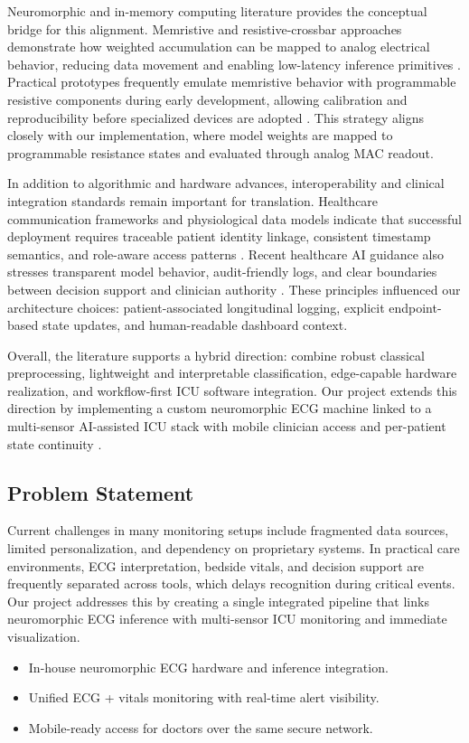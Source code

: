 \documentclass[12pt,a4paper]{article}
\begin{document}
Neuromorphic and in-memory computing literature provides the conceptual bridge for this alignment. Memristive and resistive-crossbar approaches demonstrate how weighted accumulation can be mapped to analog electrical behavior, reducing data movement and enabling low-latency inference primitives \cite{r16,r17,r18}. Practical prototypes frequently emulate memristive behavior with programmable resistive components during early development, allowing calibration and reproducibility before specialized devices are adopted \cite{r19}. This strategy aligns closely with our implementation, where model weights are mapped to programmable resistance states and evaluated through analog MAC readout.

In addition to algorithmic and hardware advances, interoperability and clinical integration standards remain important for translation. Healthcare communication frameworks and physiological data models indicate that successful deployment requires traceable patient identity linkage, consistent timestamp semantics, and role-aware access patterns \cite{r20,r21}. Recent healthcare AI guidance also stresses transparent model behavior, audit-friendly logs, and clear boundaries between decision support and clinician authority \cite{r22,r23}. These principles influenced our architecture choices: patient-associated longitudinal logging, explicit endpoint-based state updates, and human-readable dashboard context.

Overall, the literature supports a hybrid direction: combine robust classical preprocessing, lightweight and interpretable classification, edge-capable hardware realization, and workflow-first ICU software integration. Our project extends this direction by implementing a custom neuromorphic ECG machine linked to a multi-sensor AI-assisted ICU stack with mobile clinician access and per-patient state continuity \cite{r24,r25}.

\subsection{Problem Statement}

Current challenges in many monitoring setups include fragmented data sources, limited personalization, and dependency on proprietary systems. In practical care environments, ECG interpretation, bedside vitals, and decision support are frequently separated across tools, which delays recognition during critical events. Our project addresses this by creating a single integrated pipeline that links neuromorphic ECG inference with multi-sensor ICU monitoring and immediate visualization.
\begin{itemize}
  \item In-house neuromorphic ECG hardware and inference integration.
  \item Unified ECG + vitals monitoring with real-time alert visibility.
  \item Mobile-ready access for doctors over the same secure network.
\end{itemize}
\end{document}
